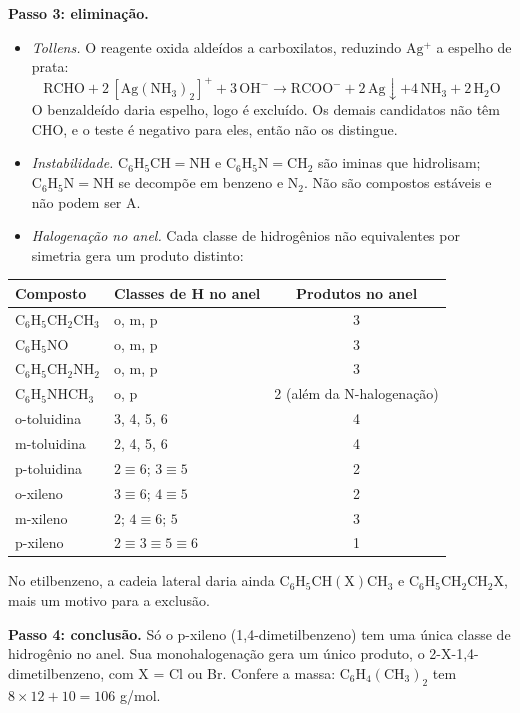 \documentclass{article}%
\begin{document}
\textbf{Passo 3: eliminação.}
\begin{itemize}
\item \textit{Tollens.} O reagente oxida aldeídos a carboxilatos, reduzindo $\mathrm{Ag^+}$ a espelho de prata:
\[
\mathrm{RCHO}+2\,[\mathrm{Ag(NH_3)_2}]^{+}+3\,\mathrm{OH^-}\rightarrow \mathrm{RCOO^-}+2\,\mathrm{Ag}\!\downarrow+4\,\mathrm{NH_3}+2\,\mathrm{H_2O}
\]
O benzaldeído daria espelho, logo é excluído. Os demais candidatos não têm CHO, e o teste é negativo para eles, então não os distingue.
\item \textit{Instabilidade.} $\mathrm{C_6H_5CH{=}NH}$ e $\mathrm{C_6H_5N{=}CH_2}$ são iminas que hidrolisam; $\mathrm{C_6H_5N{=}NH}$ se decompõe em benzeno e $\mathrm{N_2}$. Não são compostos estáveis e não podem ser A.
\item \textit{Halogenação no anel.} Cada classe de hidrogênios não equivalentes por simetria gera um produto distinto:
\end{itemize}
\begin{center}
\begin{tabular}{llc}
Composto & Classes de H no anel & Produtos no anel \\
\hline
$\mathrm{C_6H_5CH_2CH_3}$ & o, m, p & 3 \\
$\mathrm{C_6H_5NO}$ & o, m, p & 3 \\
$\mathrm{C_6H_5CH_2NH_2}$ & o, m, p & 3 \\
$\mathrm{C_6H_5NHCH_3}$ & o, p & 2 (além da N-halogenação) \\
o-toluidina & 3, 4, 5, 6 & 4 \\
m-toluidina & 2, 4, 5, 6 & 4 \\
p-toluidina & $2\equiv 6$; $3\equiv 5$ & 2 \\
o-xileno & $3\equiv 6$; $4\equiv 5$ & 2 \\
m-xileno & $2$; $4\equiv 6$; $5$ & 3 \\
p-xileno & $2\equiv 3\equiv 5\equiv 6$ & 1 \\
\end{tabular}
\end{center}
No etilbenzeno, a cadeia lateral daria ainda $\mathrm{C_6H_5CH(X)CH_3}$ e $\mathrm{C_6H_5CH_2CH_2X}$, mais um motivo para a exclusão.

\textbf{Passo 4: conclusão.} Só o p-xileno (1,4-dimetilbenzeno) tem uma única classe de hidrogênio no anel. Sua monohalogenação gera um único produto, o 2-X-1,4-dimetilbenzeno, com X = Cl ou Br. Confere a massa: $\mathrm{C_6H_4(CH_3)_2}$ tem $8\times 12+10=106$ g/mol.
\begin{center}
\end{center}
\end{document}
